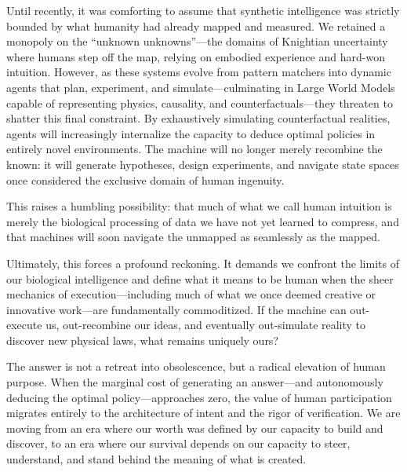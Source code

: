 \documentclass[12pt, letter]{article}
\begin{document}
Until recently, it was comforting to assume that synthetic intelligence was strictly bounded by what humanity had already mapped and measured. We retained a monopoly on the ``unknown unknowns''—the domains of Knightian uncertainty where humans step off the map, relying on embodied experience and hard-won intuition. However, as these systems evolve from pattern matchers into dynamic agents that plan, experiment, and simulate—culminating in Large World Models capable of representing physics, causality, and counterfactuals—they threaten to shatter this final constraint. By exhaustively simulating counterfactual realities, agents will increasingly internalize the capacity to deduce optimal policies in entirely novel environments. The machine will no longer merely recombine the known: it will generate hypotheses, design experiments, and navigate state spaces once considered the exclusive domain of human ingenuity.

This raises a humbling possibility: that much of what we call human intuition is merely the biological processing of data we have not yet learned to compress, and that machines will soon navigate the unmapped as seamlessly as the mapped.

Ultimately, this forces a profound reckoning. It demands we confront the limits of our biological intelligence and define what it means to be human when the sheer mechanics of execution—including much of what we once deemed creative or innovative work—are fundamentally commoditized. If the machine can out-execute us, out-recombine our ideas, and eventually out-simulate reality to discover new physical laws, what remains uniquely ours?

The answer is not a retreat into obsolescence, but a radical elevation of human purpose. When the marginal cost of generating an answer—and autonomously deducing the optimal policy—approaches zero, the value of human participation migrates entirely to the architecture of intent and the rigor of verification. We are moving from an era where our worth was defined by our capacity to build and discover, to an era where our survival depends on our capacity to steer, understand, and stand behind the meaning of what is created.
\end{document}
